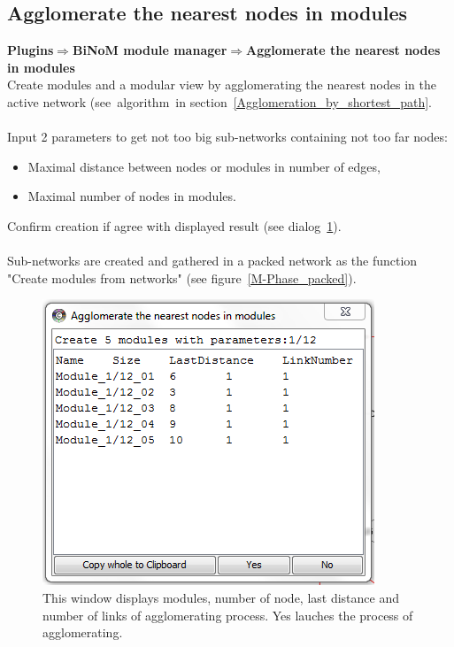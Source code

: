 \subsection{Agglomerate the nearest nodes in modules}
\textbf{Plugins$\Rightarrow$BiNoM module manager$\Rightarrow$Agglomerate the nearest nodes in modules}\\
Create modules and a modular view by agglomerating the nearest nodes in the active network (see~algorithm~in section~\ref{Agglomeration_by_shortest_path}.\\\\
Input 2 parameters to get not too big sub-networks containing not too far nodes:
\begin{itemize}
\item Maximal distance between nodes or modules in number of edges,
\item Maximal number of nodes in modules.
\end{itemize}
Confirm creation if agree with displayed result (see dialog~\ref{Agglomerate_in_modules_dialog}).\\\\
Sub-networks are created and gathered in a packed network as the function "Create modules from networks" (see figure~\ref{M-Phase_packed}).
\begin{figure}
\centering
\includegraphics[width=14 cm]{graphics/Agglomerate_in_modules_dialog}
\caption{This window displays modules, number of node, last distance and number of links of agglomerating process. Yes lauches the process of agglomerating.}
\label{Agglomerate_in_modules_dialog}
\end{figure}
